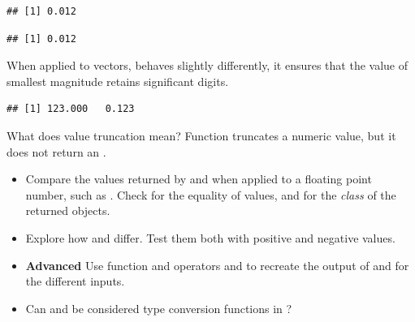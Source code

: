 \documentclass[krantz2]{krantz}\usepackage{knitr}%
\begin{document}
\begin{knitrout}\footnotesize
{}\color{fgcolor}\begin{kframe}
\begin{alltt}
\hlstd{(}\hlstd{,}  \hlstd{=} \hlstd{)}
\end{alltt}
\begin{verbatim}
## [1] 0.012
\end{verbatim}
\begin{alltt}
\hlstd{(}\hlstd{,} \hlstd{)}
\end{alltt}
\begin{verbatim}
## [1] 0.012
\end{verbatim}
\end{kframe}
\end{knitrout}

When applied to vectors,  behaves slightly differently, it ensures that the value of smallest magnitude retains  significant digits.

\begin{knitrout}\footnotesize
{}\color{fgcolor}\begin{kframe}
\begin{alltt}
\hlstd{(}\hlstd{(}\hlstd{,} \hlstd{),}  \hlstd{=} \hlstd{)}
\end{alltt}
\begin{verbatim}
## [1] 123.000   0.123
\end{verbatim}
\end{kframe}
\end{knitrout}

\begin{playground}
What does value truncation mean? Function  truncates a numeric value, but it does not return an .
\begin{itemize}
  \item Compare the values returned by  and  when applied to a floating point number, such as . Check for the equality of values, and for the \emph{class} of the returned objects.
  \item Explore how  and  differ. Test them both with positive and negative values.
  \item \textbf{Advanced} Use function  and operators \Roperator{+} and \Roperator{-} to recreate the output of  and  for the different inputs.
  \item Can  and  be considered type conversion functions in \Rlang?
\end{itemize}
\end{playground}
\end{document}
